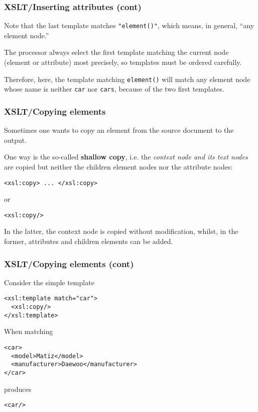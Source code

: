 %
\begin{frame}[containsverbatim]
\frametitle{XSLT/Inserting attributes (cont)}

Note that the last template matches \verb|"element()"|, which means,
in general, ``any element node.''

\bigskip

The \XSLT processor always select the first template matching the
current node (element or attribute) most precisely, so templates must
be ordered carefully.

\bigskip

Therefore, here, the template matching \verb|element()| will match any
element node whose name is neither \texttt{car} nor \texttt{cars},
because of the two first templates.

\end{frame}

%
\begin{frame}[containsverbatim]
\frametitle{XSLT/Copying elements}

Sometimes one wants to copy an element from the source document to the
output. 

\bigskip

One way is the so-called \textbf{shallow copy}, i.e. the
\emph{context node and its text nodes} are copied but neither the
children element nodes nor the attribute nodes:
{\small
\begin{verbatim}
<xsl:copy> ... </xsl:copy>
\end{verbatim}
}
or
{\small
\begin{verbatim}
<xsl:copy/>
\end{verbatim}
}
In the latter, the context node is copied without modification,
whilst, in the former, attributes and children elements can be added.

\end{frame}

%
\begin{frame}[containsverbatim]
\frametitle{XSLT/Copying elements (cont)}

Consider the simple template
{\small
\begin{verbatim}
<xsl:template match="car">
  <xsl:copy/>
</xsl:template>
\end{verbatim}
}
When matching
{\small
\begin{verbatim}
<car>
  <model>Matiz</model>
  <manufacturer>Daewoo</manufacturer>
</car>
\end{verbatim}
}
produces
{\small
\begin{verbatim}
<car/>
\end{verbatim}
}

\end{frame}

